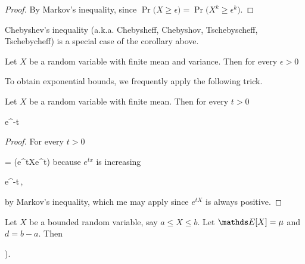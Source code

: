 \documentclass[scombinatorics.tex]{subfiles}
\begin{document}
\begin{proof}
  By Markov's inequality, since $\Pr\big(X\ge\epsilon\big)=\Pr\big(X^k\ge\epsilon^k\big)$.
\end{proof}

Chebyshev's inequality (a.k.a. Chebysheff, Chebyshov, Tschebyscheff, Tschebycheff) is a special case of the corollary above.

\begin{void_thm}\label{Chebyshev}
    Let $X$ be a random variable with finite mean and variance.
    Then for every $\epsilon>0$
    
    {\le}
    {}\QED
\end{void_thm}

To obtain exponential bounds, we frequently apply the following trick.

\begin{void_thm}\label{lem_chernoff_method}
  Let $X$ be a random variable with finite mean.
  Then for every $t>0$

  {\le}
  {e^{-t\epsilon}\,\Ex\big[e^{tX}\big]}
\end{void_thm}

\begin{proof}
  For  every $t>0$

  {=}
  {\Pr\big(e^{tX}\ge e^{t\epsilon}\big)}
  \hfill because $e^{tx}$ is increasing
  
  \ceq{}
  {\le}
  {e^{-t\epsilon}\,\Ex\big[e^{tX}\big],}

  by Markov's inequality, which me may apply since $e^{tX}$ is always positive. 
\end{proof}


  \begin{void_thm}\label{lem_Hoeffding}
    Let $X$ be a bounded random variable, say $a\le X\le b$. 
    Let $\Ex[X]=\mu$ and $d=b-a$.
    Then
    
    \ceq{\hfill\Ex\Big[e^{t(X-\mu)}\Big]}
    {\le}
    {\Big).}\smallskip
  \end{void_thm}
\end{document}
